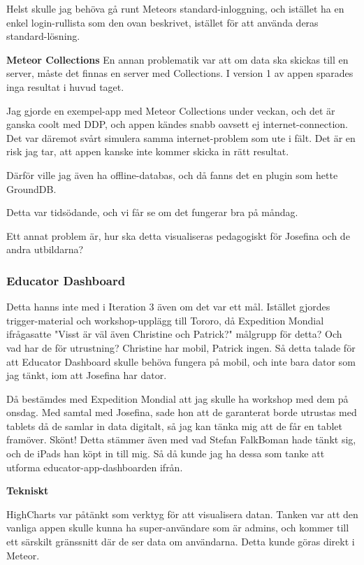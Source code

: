 Helst skulle jag behöva gå runt Meteors standard-inloggning, och istället ha en enkel login-rullista som den ovan beskrivet, istället för att använda deras standard-lösning.

\textbf{Meteor Collections}
En annan problematik var att om data ska skickas till en server, måste det finnas en server med Collections. I version 1 av appen sparades inga resultat i huvud taget.

Jag gjorde en exempel-app med Meteor Collections under veckan, och det är ganska coolt med DDP, och appen kändes snabb oavsett ej internet-connection. Det var däremot svårt simulera samma internet-problem som ute i fält. Det är en risk jag tar, att appen kanske inte kommer skicka in rätt resultat.

Därför ville jag även ha offline-databas, och då fanns det en plugin som hette GroundDB.

Detta var tidsödande, och vi får se om det fungerar bra på måndag.

Ett annat problem är, hur ska detta visualiseras pedagogiskt för Josefina och de andra utbildarna?

\subsubsection{Educator Dashboard}
Detta hanns inte med i Iteration 3 även om det var ett mål. Istället gjordes trigger-material och workshop-upplägg till Tororo, då Expedition Mondial ifrågasatte "Visst är väl även Christine och Patrick?" målgrupp för detta? Och vad har de för utrustning? Christine har mobil, Patrick ingen. Så detta talade för att Educator Dashboard skulle behöva fungera på mobil, och inte bara dator som jag tänkt, iom att Josefina har dator.

Då bestämdes med Expedition Mondial att jag skulle ha workshop med dem på onsdag. Med samtal med Josefina, sade hon att de garanterat borde utrustas med tablets då de samlar in data digitalt, så jag kan tänka mig att de får en tablet framöver. Skönt! Detta stämmer även med vad Stefan FalkBoman hade tänkt sig, och de iPads han köpt in till mig. Så då kunde jag ha dessa som tanke att utforma educator-app-dashboarden ifrån.

\textbf{Tekniskt}

HighCharts var påtänkt som verktyg för att visualisera datan. Tanken var att den vanliga appen skulle kunna ha super-användare som är admins, och kommer till ett särskilt gränssnitt där de ser data om användarna. Detta kunde göras direkt i Meteor.

